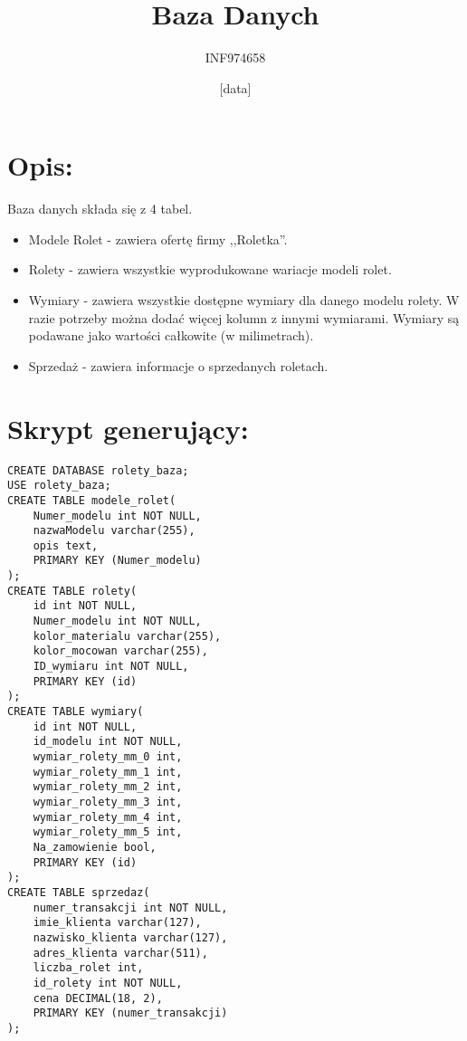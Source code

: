 \documentclass[a4paper,12pt]{article}
\title{Baza Danych}
\author{INF974658}
\date{[data]}
\begin{document}
\section{Opis:}

Baza danych składa się z 4 tabel.
\begin{itemize}
		\item Modele Rolet - zawiera ofertę firmy ,,Roletka''.
		\item Rolety - zawiera wszystkie wyprodukowane wariacje modeli rolet.
		\item Wymiary - zawiera wszystkie dostępne wymiary dla danego modelu rolety. W razie potrzeby
				można dodać więcej kolumn z innymi wymiarami. Wymiary są podawane jako wartości całkowite
				(w milimetrach).
		\item Sprzedaż - zawiera informacje o sprzedanych roletach.
\end{itemize}

\section{Skrypt generujący:}

\begin{lstlisting}
CREATE DATABASE rolety_baza;
USE rolety_baza;
CREATE TABLE modele_rolet(
    Numer_modelu int NOT NULL,
    nazwaModelu varchar(255),
    opis text,
    PRIMARY KEY (Numer_modelu)
);
CREATE TABLE rolety(
    id int NOT NULL,
    Numer_modelu int NOT NULL,
    kolor_materialu varchar(255),
    kolor_mocowan varchar(255),
    ID_wymiaru int NOT NULL,
    PRIMARY KEY (id)
);
CREATE TABLE wymiary(
    id int NOT NULL,
    id_modelu int NOT NULL,
    wymiar_rolety_mm_0 int,
    wymiar_rolety_mm_1 int,
    wymiar_rolety_mm_2 int,
    wymiar_rolety_mm_3 int,
    wymiar_rolety_mm_4 int,
    wymiar_rolety_mm_5 int,
    Na_zamowienie bool,
    PRIMARY KEY (id)
);
CREATE TABLE sprzedaz(
    numer_transakcji int NOT NULL,
    imie_klienta varchar(127),
    nazwisko_klienta varchar(127),
    adres_klienta varchar(511),
    liczba_rolet int,
    id_rolety int NOT NULL,
    cena DECIMAL(18, 2),
    PRIMARY KEY (numer_transakcji)
);
\end{lstlisting}
\end{document}

